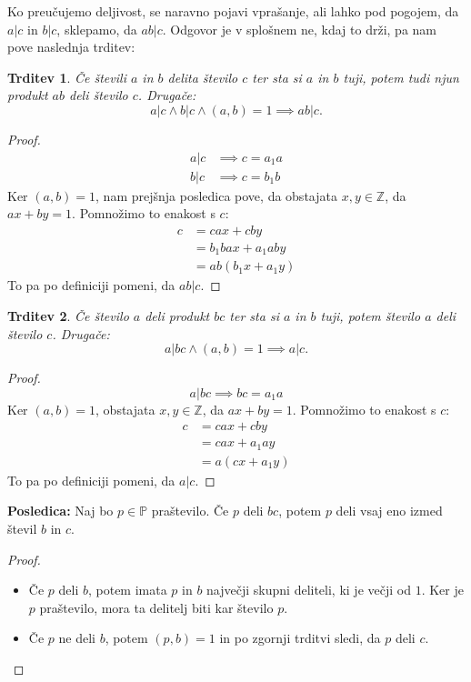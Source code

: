 \documentclass[12pt, a4paper]{article}
\newtheorem{trd}{Trditev}
\newenvironment{posl}[1][]{\par\medskip\noindent \textbf{Posledica: }}{\medskip}
\begin{document}
Ko preučujemo deljivost, se naravno pojavi vprašanje, ali lahko pod pogojem, da $a|c$ in $b|c$, sklepamo, da $ab|c$. Odgovor je v splošnem ne, kdaj to drži, pa nam pove naslednja trditev:

\begin{trd}
Če števili $a$ in $b$ delita število $c$ ter sta si $a$ in $b$ tuji, potem tudi njun produkt $ab$ deli število $c$. Drugače:
$$a|c \land b|c \land (a,b)=1\implies ab|c.$$
\end{trd}

\begin{proof}
\begin{align*}
a|c &\implies c=a_1 a \\
b|c &\implies c=b_1 b
\end{align*}
Ker $(a,b)=1$, nam prejšnja posledica pove, da obstajata $x,y\in \mathbb{Z}$, da $ax+by=1$. Pomnožimo to enakost s $c$:
\begin{align*}
c&=cax + cby \\
&=b_1 bax + a_1 aby \\
&=ab(b_1 x + a_1 y)
\end{align*}
To pa po definiciji pomeni, da $ab|c$.
\end{proof}
 
\begin{trd}
Če število $a$ deli produkt $bc$ ter sta si $a$ in $b$ tuji, potem število $a$ deli število $c$. Drugače:
$$a|bc \land (a,b)=1\implies a|c.$$
\end{trd}

\begin{proof}
$$a|bc \implies bc=a_1 a$$
Ker $(a,b)=1$, obstajata $x,y\in \mathbb{Z}$, da $ax+by=1$. Pomnožimo to enakost s $c$:
\begin{align*}
c&=cax + cby \\
&=cax + a_1 ay \\
&=a(cx + a_1 y)
\end{align*}
To pa po definiciji pomeni, da $a|c$.
\end{proof}

\begin{posl}
Naj bo $p\in \mathbb{P}$ praštevilo. Če $p$ deli $bc$, potem $p$ deli vsaj eno izmed števil $b$ in $c$.
\end{posl}

\begin{proof}
\begin{itemize}
\item Če $p$ deli $b$, potem imata $p$ in $b$ največji skupni deliteli, ki je večji od $1$. Ker je $p$ praštevilo, mora ta delitelj biti kar število $p$.
\item Če $p$ ne deli $b$, potem $(p,b)=1$ in po zgornji trditvi sledi, da $p$ deli $c$.
\end{itemize}
\end{proof}
\end{document}

